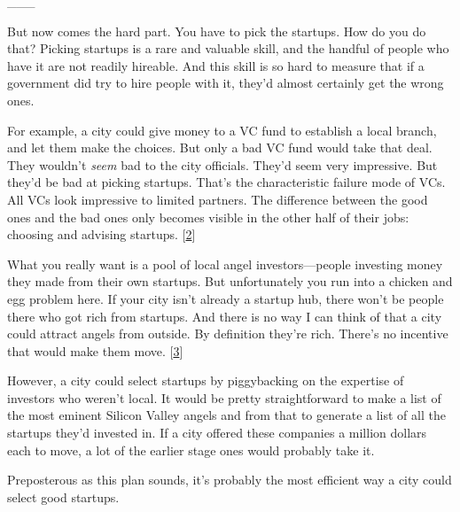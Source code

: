                   \_\_\_
                  

But now comes the hard part. You have to pick the
                  startups. How do you do that? Picking startups is a rare and
                  valuable skill, and the handful of people who have it are not
                  readily hireable. And this skill is so hard to measure that if
                  a government did try to hire people with it, they'd almost
                  certainly get the wrong ones.

For example, a city
                  could give money to a VC fund to establish a local branch, and
                  let them make the choices. But only a bad VC fund would take
                  that deal. They wouldn't \emph{seem} bad to the city
                  officials. They'd seem very impressive. But they'd be bad at
                  picking startups. That's the characteristic failure mode of
                  VCs. All VCs look impressive to limited partners. The
                  difference between the good ones and the bad ones only becomes
                  visible in the other half of their jobs: choosing and advising
                  startups.
                  [\href{\#f2n}{2}]

What you really want is a pool of local angel
                  investors---people investing money they made from their
                  own startups. But unfortunately you run into a chicken and egg
                  problem here. If your city isn't already a startup hub, there
                  won't be people there who got rich from startups. And there is
                  no way I can think of that a city could attract angels from
                  outside. By definition they're rich. There's no incentive that
                  would make them move.
                  [\href{\#f3n}{3}]

However, a city could select startups by
                  piggybacking on the expertise of investors who weren't local.
                  It would be pretty straightforward to make a list of the most
                  eminent Silicon Valley angels and from that to generate a list
                  of all the startups they'd invested in. If a city offered
                  these companies a million dollars each to move, a lot of the
                  earlier stage ones would probably take it.

Preposterous
                  as this plan sounds, it's probably the most efficient way a
                  city could select good startups.

